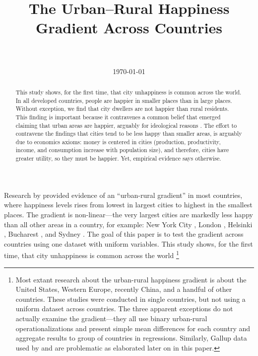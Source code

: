 \documentclass[10pt, letterpaper]{article}
\date{{}\today  \hspace{.2in}\xxivtime}
\title{  %
The Urban--Rural Happiness Gradient Across Countries\\
\\ 
}
\author{
}
\begin{document}


\maketitle
\vspace{-.4in}
\begin{center}

\end{center}


\begin{abstract}
This study shows, for the first time, that city unhappiness is 
common across the world. In all developed countries, people are happier in smaller places than in large places. Without exception, we find that city dwellers are not happier than rural residents. This finding is important because it contravenes a common belief that emerged claiming that urban areas are happier, arguably for ideological reasons \citep[e.g.,][]{glaeser11,glaeser14,burger20}. The effort to contravene the findings that cities tend to be less happy than smaller areas, is arguably due to economics axioms: money is centered in cities (production, productivity, income, and consumption increase with population size), and therefore, cities have greater utility, so they must be happier. Yet, empirical evidence says otherwise. 
\end{abstract}
\vspace{.15in} 
\noindent{\sc %
}
\vspace{.25in} 

Research by \cite{aok11a} provided evidence of an ``urban-rural gradient'' in most countries, where happiness levels rises from lowest in largest cities to highest in the smallest places. The gradient is non-linear---the very largest cities are markedly less happy than all other areas in a country, for example: New York City \citep{aok_brfss_city_cize16,senior_ny_sep16_14}, London \citep{ons11,ibt13}, Helsinki \citep{morrison15}, Bucharest \citep{lenzi16D}, and Sydney \citep[cited in][]{morrison11}.
The goal of this paper is to test the gradient across countries using one dataset with uniform variables. This study shows, for the first time, that city unhappiness is common across the world \footnote{Most extant research about the urban-rural happiness gradient is about the United States, Western Europe, recently China, and a handful of other countries. These studies were conducted in single countries, but not using a uniform dataset across countries. The three apparent exceptions \citep{aokcities,burger20,easterlin10al} do not actually examine the gradient---they all use binary urban-rural operationalizations and present simple mean differences for each country and aggregate results to group of countries in regressions. Similarly, Gallup data used by \citet{burger20} and \citet{easterlin10al} are problematic as elaborated later on in this paper.}
 
\end{document}
